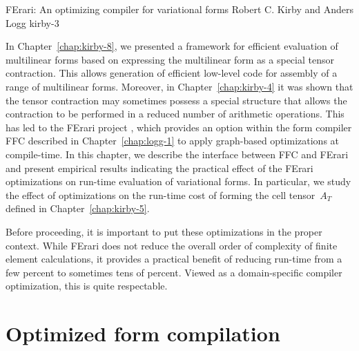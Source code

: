               {FErari: An optimizing compiler for variational forms}
              {Robert C. Kirby and Anders Logg}
              {kirby-3}

In Chapter~\ref{chap:kirby-8}, we presented a framework for
efficient evaluation of multilinear forms based on expressing
the multilinear form as a special tensor contraction. This allows
generation of efficient low-level code for assembly of a range of
multilinear forms. Moreover, in Chapter~\ref{chap:kirby-4} it was
shown that the tensor contraction may sometimes possess a special
structure that allows the contraction to be performed in a reduced
number of arithmetic operations. This has led to the FErari project
\citep{KirbyKnepleyLoggEtAl2005,KirbyLoggScottEtAl2006,KirbyScott2007,KirbyLogg2008},
which provides an option within the form compiler FFC described
in Chapter~\ref{chap:logg-1} to apply graph-based optimizations at
compile-time. In this chapter, we describe the interface between FFC and
FErari and present empirical results indicating the practical effect of
the FErari optimizations on run-time evaluation of variational forms. In
particular, we study the effect of optimizations on the run-time cost
of forming the cell tensor~$A_T$ defined in Chapter~\ref{chap:kirby-5}.

Before proceeding, it is important to put these optimizations in the
proper context. While FErari does not reduce the overall order of
complexity of finite element calculations, it provides a practical
benefit of reducing run-time from a few percent to sometimes tens of
percent. Viewed as a domain-specific compiler optimization, this is
quite respectable.

\section{Optimized form compilation}

